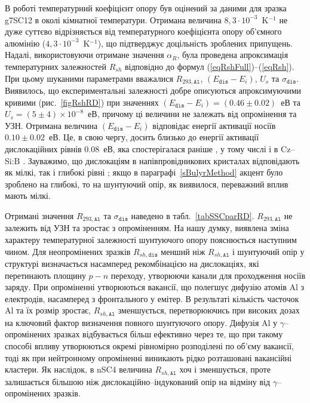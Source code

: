 В роботі температурний коефіцієнт опору був оцінений за даними для зразка g7SC12 в околі кімнатної температури.
Отримана величина $8,3\cdot10^{-3}$~K$^{-1}$ не дуже суттєво відрізняється від температурного
коефіцієнта опору об'ємного алюмінію ($4,3\cdot10^{-3}$~K$^{-1}$),
що підтверджує доцільність зроблених припущень.
Надалі, використовуючи отримане значення $\alpha_R$, була
проведена апроксимація температурних залежностей $R_{sh}$ відповідно до формул (\ref{eqRshFull})--(\ref{eqRsh}).
При цьому шуканими параметрами вважалися $R_{293,\mathtt{Al}}$, $(E_{\mathtt{dis}}-E_i)$, $U_s$ та $\sigma_{\mathtt{dis}}$.
Виявилось, що експериментальні залежності добре описуються апроксимуючими кривими (рис.~\ref{figRshRD})
при значеннях $(E_{\mathtt{dis}}-E_i)=(0.46\pm0.02)$~еВ та $U_s=(5\pm4)\times10^{-8}$~еВ,
причому ці величини не залежать від опромінення та УЗН.
Отримана величина $(E_{\mathtt{dis}}-E_i)$ відповідає енергії активації носіїв $0.10\pm0.02$~еВ.
Це, в свою чергу, досить близько до енергії активації дислокаційних рівнів $0.08$~еВ,
яка спостерігалася раніше \cite{disl10:Castaldini,disl10:Isakova,disl10:Yur,disl10:Kveder,disl10:Trushin,Si:disl},
у тому числі і в Cz--Si:B \cite{disl10:Castaldini,disl10:Isakova,disl10:Yu}.
Зауважимо, що дислокаціям в напівпровідникових кристалах відповідають як мілкі,
так і глибокі рівні \cite{Disl:GaN};
якщо в параграфі~\ref{sBulyrMethod} акцент було зроблено на глибокі, то на шунтуючий опір, як виявилося,
переважний вплив мають мілкі.


Отримані значення $R_{293,\mathtt{Al}}$ та $\sigma_{\mathtt{dis}}$ наведено в табл.~\ref{tabSSCparRD}.
$R_{293,\mathtt{Al}}$ не залежить від УЗН та зростає з опроміненням.
На нашу думку, виявлена зміна характеру температурної залежності шунтуючого опору пояснюється
наступним чином.
Для неопромінених зразків $R_{sh,\mathtt{dis}}$ менший ніж $R_{sh,\mathtt{Al}}$ і шунтуючий опір
у структурі визначається насамперед рекомбінацією на дислокаціях, які перетинають площину $p-n$ переходу,
утворюючи канали для проходження носіїв заряду.
При опроміненні утворюються вакансії, що полегшує дифузію атомів Al з електродів, насамперед з фронтального у емітер.
В результаті кількість часточок Al та їх розмір зростає, $R_{sh,\mathtt{Al}}$ зменшується,
перетворюючись при високих дозах на ключовий фактор визначення повного шунтуючого опору.
Дифузія Al у $\gamma$--опромінених зразках відбувається більш ефективно через те, що
 при такому способі впливу утворюються окремі рівномірно розподілені по об'єму вакансії, тоді
 як при нейтронному опроміненні виникають рідко розташовані вакансійні кластери.
Як наслідок, в nSC4 величина $R_{sh,\mathtt{Al}}$ хоч і зменшується, проте залишається
більшою ніж дислокаційно--індукований опір на відміну від $\gamma$--опромінених зразків.

